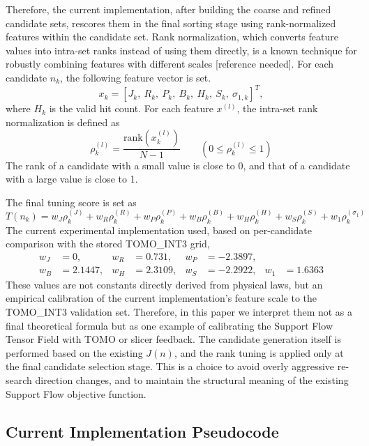 \documentclass[11pt,a4paper]{article}
\begin{document}
Therefore, the current implementation, after building the coarse and refined candidate sets,
rescores them in the final sorting stage using rank-normalized features within the candidate set.
Rank normalization, which converts feature values into intra-set ranks instead of using them directly,
is a known technique for robustly combining features with different scales [reference needed].
For each candidate $n_k$, the following feature vector is set.
\begin{equation}
x_k
=
\left[
J_k,\ R_k,\ P_k,\ B_k,\ H_k,\ S_k,\ \sigma_{1,k}
\right]^T ,
\end{equation}
where $H_k$ is the valid hit count.
For each feature $x^{(l)}$, the intra-set rank normalization is defined as
\begin{equation}
\rho^{(l)}_k
=
\frac{\mathrm{rank}(x^{(l)}_k)}{N-1}
\qquad
\left(0\le \rho^{(l)}_k\le 1\right)
\end{equation}
The rank of a candidate with a small value is close to 0, and that of a candidate with a large value is close to 1.

The final tuning score is set as
\begin{equation}
T(n_k)
=
w_J\rho^{(J)}_k
+w_R\rho^{(R)}_k
+w_P\rho^{(P)}_k
+w_B\rho^{(B)}_k
+w_H\rho^{(H)}_k
+w_S\rho^{(S)}_k
+w_1\rho^{(\sigma_1)}_k
\end{equation}
The current experimental implementation used, based on per-candidate comparison with the stored TOMO\_INT3 grid,
\begin{equation}
\begin{aligned}
w_J&=0, &
w_R&=0.731, &
w_P&=-2.3897,\\
w_B&=2.1447, &
w_H&=2.3109, &
w_S&=-2.2922, &
w_1&=1.6363
\end{aligned}
\end{equation}
These values are not constants directly derived from physical laws, but
an empirical calibration of the current implementation's feature scale to the TOMO\_INT3 validation set.
Therefore, in this paper we interpret them not as a final theoretical formula but
as one example of calibrating the Support Flow Tensor Field with TOMO or slicer feedback.
The candidate generation itself is performed based on the existing $J(n)$,
and the rank tuning is applied only at the final candidate selection stage.
This is a choice to avoid overly aggressive re-search direction changes,
and to maintain the structural meaning of the existing Support Flow objective function.

\subsection{Current Implementation Pseudocode}
\end{document}
